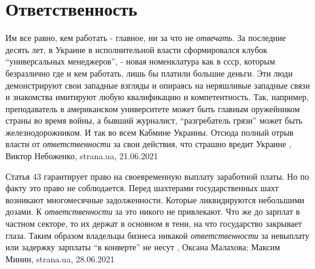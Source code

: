  
 
 
 
 
\chapter{Ответственность}
\label{sec:slova.otvetstvennost}

Им все равно, кем работать - главное, ни за что не \emph{отвечать}.  За
последние десять лет, в Украине в исполнительной власти сформировался клубок
\enquote{универсальных менеджеров}, - новая номенклатура как в ссср, которым безразлично
где и кем работать, лишь бы платили большие деньги. Эти люди демонстрируют свои
западные взгляды и опираясь на неряшливые западные связи и знакомства имитируют
любую квалификацию и компетентность. Так, например, преподаватель в
американском университете может быть главным оружейником страны во время войны,
а бывший журналист, \enquote{разгребатель грязи} может быть железнодорожником. И так во
всем Кабмине Украины.  Отсюда полный отрыв власти от \emph{ответственности} за
свои действия, что страшно вредит Украине
, 
Виктор Небоженко, strana.ua, 21.06.2021


Статья 43 гарантирует право на своевременную выплату заработной платы.  Но по
факту это право не соблюдается. Перед шахтерами государственных шахт возникают
многомесячные задолженности. Которые ликвидируются небольшими дозами. К
\emph{ответственности} за это никого не привлекают.  Что же до зарплат в частном
секторе, то их держат в основном в тени, на что государство закрывает глаза.
Таким образом владельцы бизнеса никакой \emph{ответственности} за невыплату или
задержку зарплаты \enquote{в конверте} не несут
, 
Оксана Малахова; Максим Минин, strana.ua, 28.06.2021

